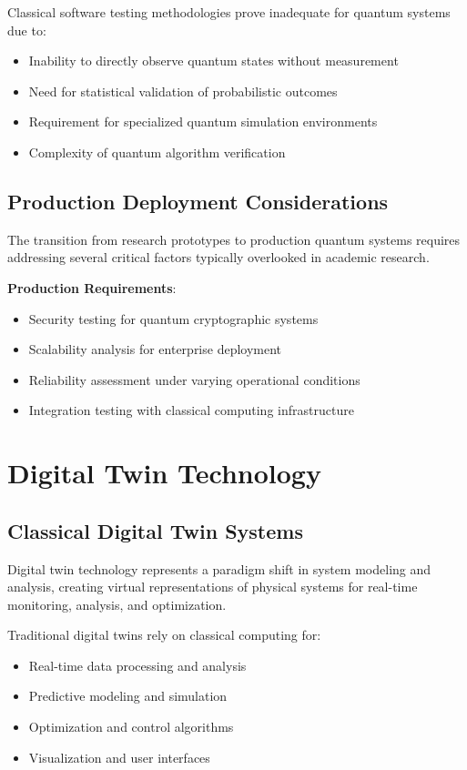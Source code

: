 \documentclass[12pt,a4paper]{report}
\begin{document}
Classical software testing methodologies prove inadequate for quantum systems due to:
\begin{itemize}
\item Inability to directly observe quantum states without measurement
\item Need for statistical validation of probabilistic outcomes
\item Requirement for specialized quantum simulation environments
\item Complexity of quantum algorithm verification
\end{itemize}

\subsection{Production Deployment Considerations}

The transition from research prototypes to production quantum systems requires addressing several critical factors typically overlooked in academic research.

\textbf{Production Requirements}:
\begin{itemize}
\item Security testing for quantum cryptographic systems
\item Scalability analysis for enterprise deployment
\item Reliability assessment under varying operational conditions
\item Integration testing with classical computing infrastructure
\end{itemize}

\section{Digital Twin Technology}

\subsection{Classical Digital Twin Systems}

Digital twin technology represents a paradigm shift in system modeling and analysis, creating virtual representations of physical systems for real-time monitoring, analysis, and optimization.

Traditional digital twins rely on classical computing for:
\begin{itemize}
\item Real-time data processing and analysis
\item Predictive modeling and simulation
\item Optimization and control algorithms
\item Visualization and user interfaces
\end{itemize}
\end{document}
